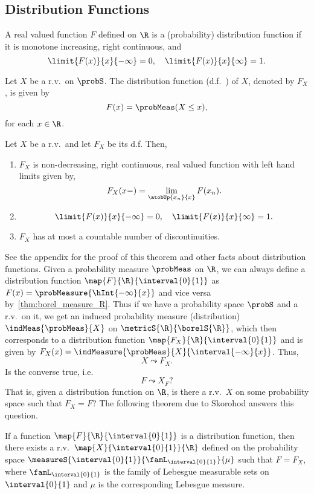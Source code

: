 \subsection{Distribution Functions}
\begin{Definition}[name= (Probability) Distribution function]
    A real valued function $F$ defined on $\R$ is a (probability) distribution function if it is 
    monotone increasing, right
    continuous, and 
    \[\limit{F(x)}{x}{-\infty} = 0,\quad \limit{F(x)}{x}{\infty} = 1.\]
\end{Definition}

\begin{Definition}
    Let $X$ be a r.v.~on $\probS$. The distribution function (d.f.~) of $X$, denoted by $F_X$, is given by
    \[F(x) = \probMeas(X\leq x),\] for each $x \in \R$.
\end{Definition}
\begin{Theorem}
    Let $X$ be a r.v.~and let $F_X$ be its d.f. Then, 
    \begin{enumerate}
	\item
	    $F_X$ is non-decreasing, right continuous, real valued function with left hand limits given by,
	    \[F_X(x-) = \lim\limits_{\atobUp{x_n}{x}}F(x_n).\]
	\item
	    \[\limit{F(x)}{x}{-\infty} = 0,\quad \limit{F(x)}{x}{\infty} = 1.\]
	\item
	    $F_X$ has at most a countable number of discontinuities.
    \end{enumerate}
\end{Theorem}
See the appendix for the proof of this theorem and other facts about distribution functions. 
Given a probability measure $\probMeas$ on $\R$, we can always define a distribution function
$\map{F}{\R}{\interval{0}{1}}$ as $F(x) = \probMeasure{\hInt{-\infty}{x}}$ and vice versa
by~\ref{thm:borel_measure_R}. Thus if we have a probability space $\probS$ and a r.v.~on it, we get an induced
probability measure (distribution) $\indMeas{\probMeas}{X}$ on $\metricS{\R}{\borelS{\R}}$,
which then corresponds to a distribution function $\map{F_X}{\R}{\interval{0}{1}}$ and is 
given by $F_X(x) = \indMeasure{\probMeas}{X}{\interval{-\infty}{x}}$.
Thus,
\[X \leadsto F_X.\]
Is the converse true, i.e.
\[F \leadsto X_F?\]
That is, given a distribution function on $\R$, is there a r.v.~$X$ on some probability space such that $F_X =
F$?
The following theorem due to Skorohod answers this question.
\begin{Theorem}\label{thm:distribution_func_to_rv}
    If a function $\map{F}{\R}{\interval{0}{1}}$ is a distribution function, then there exists a
    r.v.~$\map{X}{\interval{0}{1}}{\R}$ defined
    on the probability space $\measureS{\interval{0}{1}}{\famL_{\interval{0}{1}}}{\mu}$ such that $F = F_X$,
    where $\famL_{\interval{0}{1}}$ is the family of Lebesgue measurable sets on $\interval{0}{1}$ and $\mu$
    is the corresponding Lebesgue measure.
\end{Theorem}
